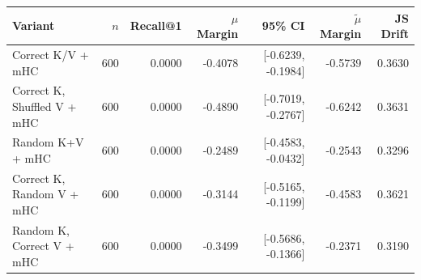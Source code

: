 \begin{tabular}{l r r r r r r}
\toprule
Variant & $n$ & Recall@1 & $\mu$ Margin & 95\% CI & $\tilde{\mu}$ Margin & JS Drift \\
\midrule
Correct K/V + mHC & 600 & 0.0000 & -0.4078 & [-0.6239, -0.1984] & -0.5739 & 0.3630 \\
Correct K, Shuffled V + mHC & 600 & 0.0000 & -0.4890 & [-0.7019, -0.2767] & -0.6242 & 0.3631 \\
Random K+V + mHC & 600 & 0.0000 & -0.2489 & [-0.4583, -0.0432] & -0.2543 & 0.3296 \\
Correct K, Random V + mHC & 600 & 0.0000 & -0.3144 & [-0.5165, -0.1199] & -0.4583 & 0.3621 \\
Random K, Correct V + mHC & 600 & 0.0000 & -0.3499 & [-0.5686, -0.1366] & -0.2371 & 0.3190 \\
\bottomrule
\end{tabular}
